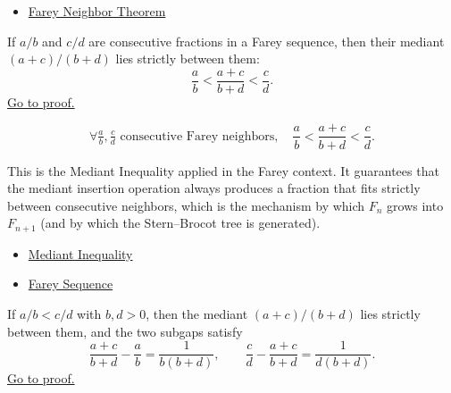 \begin{dependencies}
\begin{itemize}
  \item \hyperref[thm:farey-neighbor-theorem]{Farey Neighbor Theorem}
\end{itemize}
\end{dependencies}

\begin{theorem}
\label{thm:farey-mediant-property}
If $a/b$ and $c/d$ are consecutive fractions in a Farey sequence, then
their mediant $(a+c)/(b+d)$ lies strictly between them:
\[
\frac{a}{b} < \frac{a+c}{b+d} < \frac{c}{d}.
\]
\hyperref[prf:farey-mediant-property]{Go to proof.}
\end{theorem}

\begin{remark*}
\[
\forall \tfrac{a}{b}, \tfrac{c}{d} \text{ consecutive Farey neighbors},\quad
\frac{a}{b} < \frac{a+c}{b+d} < \frac{c}{d}.
\]
\end{remark*}

\begin{remark*}[Interpretation]
This is the Mediant Inequality applied in the Farey context.  It guarantees
that the mediant insertion operation always produces a fraction that fits
strictly between consecutive neighbors, which is the mechanism by which
$F_n$ grows into $F_{n+1}$ (and by which the Stern--Brocot tree is generated).
\end{remark*}

\begin{dependencies}
\begin{itemize}
  \item \hyperref[thm:mediant-inequality]{Mediant Inequality}
  \item \hyperref[def:farey-sequence]{Farey Sequence}
\end{itemize}
\end{dependencies}

\begin{lemma}
\label{lem:mediant-gap}
If $a/b < c/d$ with $b, d > 0$, then the mediant $(a+c)/(b+d)$ lies
strictly between them, and the two subgaps satisfy
\[
\frac{a+c}{b+d} - \frac{a}{b} = \frac{1}{b(b+d)},
\qquad
\frac{c}{d} - \frac{a+c}{b+d} = \frac{1}{d(b+d)}.
\]
\hyperref[prf:mediant-gap]{Go to proof.}
\end{lemma}

